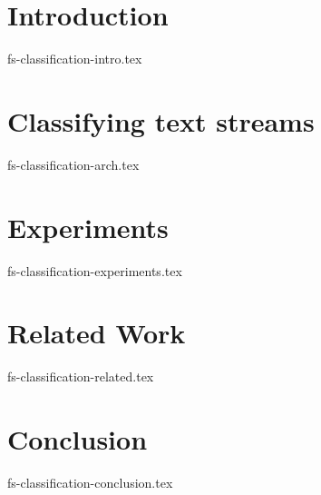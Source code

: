 \documentclass[sigconf]{acmart}
\theoremstyle{remark}
\begin{document}
\section {Introduction}
 {fs-classification-intro.tex}

\section {Classifying text streams}
 {fs-classification-arch.tex}

\section {Experiments}
 {fs-classification-experiments.tex}

\section{Related Work}
 {fs-classification-related.tex}

\section {Conclusion}
 {fs-classification-conclusion.tex}



\end{document}
